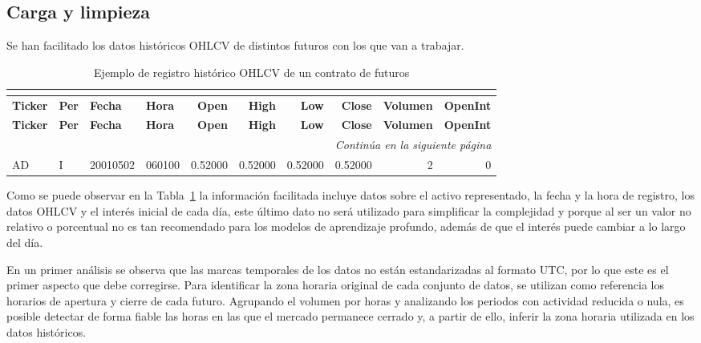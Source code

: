 \subsection{Carga y limpieza}

Se han facilitado los datos históricos OHLCV de distintos futuros con los que van a trabajar.

{
\setlength{\LTleft}{-20cm plus 1fill}
\setlength{\LTright}{-20cm plus 1fill}
\begin{longtable}{l l l l r r r r r r}
\caption{Ejemplo de registro histórico OHLCV de un contrato de futuros} \\
\label{tab:ohlcv_ejemplo} \\
\toprule
\textbf{Ticker} & \textbf{Per} & \textbf{Fecha} & \textbf{Hora} &
\textbf{Open} & \textbf{High} & \textbf{Low} & \textbf{Close} &
\textbf{Volumen} & \textbf{OpenInt} \\
\midrule
\endfirsthead

\toprule
\textbf{Ticker} & \textbf{Per} & \textbf{Fecha} & \textbf{Hora} &
\textbf{Open} & \textbf{High} & \textbf{Low} & \textbf{Close} &
\textbf{Volumen} & \textbf{OpenInt} \\
\midrule
\endhead

\midrule
\multicolumn{10}{r}{\textit{Continúa en la siguiente página}} \\
\midrule
\endfoot

\bottomrule
\endlastfoot

AD & I & 20010502 & 060100 & 0.52000 & 0.52000 & 0.52000 & 0.52000 & 2 & 0 \\
\end{longtable}
}

Como se puede observar en la Tabla~\ref{tab:ohlcv_ejemplo} la información facilitada incluye datos sobre el activo representado, la fecha y la hora de
registro, los datos OHLCV y el interés inicial de cada día, este último dato no será utilizado para simplificar la complejidad y porque al ser un
valor no relativo o porcentual no es tan recomendado para los modelos de aprendizaje profundo, además de que el interés puede cambiar a lo largo del
día.

En un primer análisis se observa que las marcas temporales de los datos no están estandarizadas al formato UTC, por lo que este es el primer aspecto
que debe corregirse. Para identificar la zona horaria original de cada conjunto de datos, se utilizan como referencia los horarios de apertura y
cierre de cada futuro. Agrupando el volumen por horas y analizando los periodos con actividad reducida o nula, es posible detectar de forma fiable las
horas en las que el mercado permanece cerrado y, a partir de ello, inferir la zona horaria utilizada en los datos históricos.

